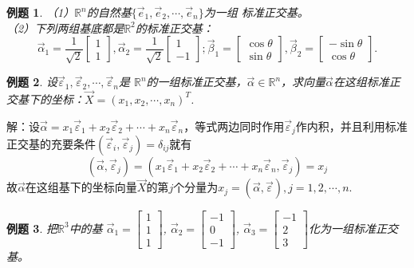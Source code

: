 \documentclass[a4paper]{book}
\newtheorem{eg}{例题}[chapter]
\begin{document}
\begin{eg}
（1）$\mathbb{R}^n$的自然基$\{\vec{e}_1,\vec{e}_2,\cdots,\vec{e}_n\}$为一组
标准正交基。\\
（2）下列两组基底都是$\mathbb{R}^2$的标准正交基：
\begin{equation*}
\vec{\alpha}_1=\frac{1}{\sqrt{2}}\begin{bmatrix}1\\1\end{bmatrix},
\vec{\alpha}_2=\frac{1}{\sqrt{2}}\begin{bmatrix}1\\-1\end{bmatrix};
\vec{\beta}_1=\begin{bmatrix}\cos\theta\\ \sin\theta\end{bmatrix},
\vec{\beta}_2=\begin{bmatrix}-\sin\theta\\ \cos\theta\end{bmatrix}.
\end{equation*}
\end{eg}
\begin{eg}
设$\vec{\varepsilon}_1,\vec{\varepsilon}_2,\cdots,\vec{\varepsilon}_n$是
$\mathbb{R}^n$的一组标准正交基，$\vec{\alpha}\in\mathbb{R}^n$，求向量$\vec{\alpha}$在这组标准正交基下的坐标：$\vec{X}=(x_1,x_2,\cdots,x_n)^T$.\
\end{eg}
解：设$\vec{\alpha}=x_1\vec{\varepsilon}_1+
x_2\vec{\varepsilon}_2+\cdots+x_n\vec{\varepsilon}_n$，等式两边同时作用$\vec{\varepsilon}_j$作内积，并且利用标准正交基的充要条件$(\vec{\varepsilon}_i,\vec{\varepsilon}_j)=\delta_{ij}$就有
\begin{equation*}
(\vec{\alpha},\vec{\varepsilon}_j)=(x_1\vec{\varepsilon}_1+
x_2\vec{\varepsilon}_2+\cdots+x_n\vec{\varepsilon}_n,
\vec{\varepsilon}_j)=x_j
\end{equation*}
故$\vec{\alpha}$在这组基下的坐标向量$\vec{X}$的第$j$个分量为$x_j=(\vec{\alpha},\vec{\varepsilon}),j=1,2,\cdots,n$.
\begin{eg}
把$\mathbb{R}^3$中的基
$\vec{\alpha}_1=\begin{bmatrix}1\\1\\1\end{bmatrix}$,
$\vec{\alpha}_2=\begin{bmatrix}-1\\0\\-1\end{bmatrix}$,
$\vec{\alpha}_3=\begin{bmatrix}-1\\2\\3\end{bmatrix}$化为一组标准正交基。
\end{eg}
\end{document}
